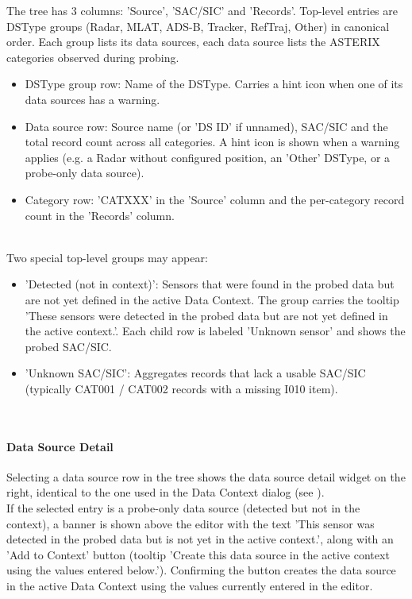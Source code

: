 The tree has 3 columns: 'Source', 'SAC/SIC' and 'Records'. Top-level entries are DSType groups (Radar, MLAT, ADS-B, Tracker, RefTraj, Other) in canonical order. Each group lists its data sources, each data source lists the ASTERIX categories observed during probing. \\

\begin{itemize}
\item DSType group row: Name of the DSType. Carries a hint icon when one of its data sources has a warning.
\item Data source row: Source name (or 'DS ID' if unnamed), SAC/SIC and the total record count across all categories. A hint icon is shown when a warning applies (e.g. a Radar without configured position, an 'Other' DSType, or a probe-only data source).
\item Category row: 'CATXXX' in the 'Source' column and the per-category record count in the 'Records' column.
\end{itemize}
\ \\

Two special top-level groups may appear:

\begin{itemize}
\item 'Detected (not in context)': Sensors that were found in the probed data but are not yet defined in the active Data Context. The group carries the tooltip 'These sensors were detected in the probed data but are not yet defined in the active context.'. Each child row is labeled 'Unknown sensor' and shows the probed SAC/SIC.
\item 'Unknown SAC/SIC': Aggregates records that lack a usable SAC/SIC (typically CAT001 / CAT002 records with a missing I010 item).
\end{itemize}
\ \\

\paragraph{Data Source Detail}

Selecting a data source row in the tree shows the data source detail widget on the right, identical to the one used in the Data Context dialog (see ). \\

If the selected entry is a probe-only data source (detected but not in the context), a banner is shown above the editor with the text 'This sensor was detected in the probed data but is not yet in the active context.', along with an 'Add to Context' button (tooltip 'Create this data source in the active context using the values entered below.'). Confirming the button creates the data source in the active Data Context using the values currently entered in the editor. \\

